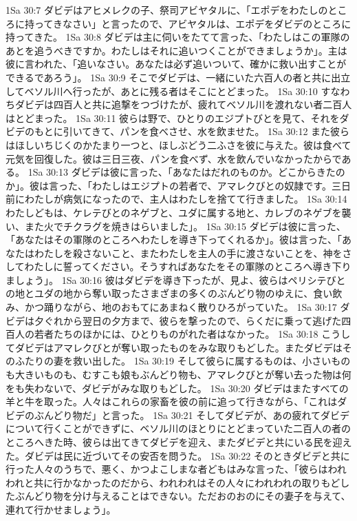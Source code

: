 1Sa 30:7  ダビデはアヒメレクの子、祭司アビヤタルに、「エポデをわたしのところに持ってきなさい」と言ったので、アビヤタルは、エポデをダビデのところに持ってきた。
1Sa 30:8  ダビデは主に伺いをたてて言った、「わたしはこの軍隊のあとを追うべきですか。わたしはそれに追いつくことができましょうか」。主は彼に言われた、「追いなさい。あなたは必ず追いついて、確かに救い出すことができるであろう」。
1Sa 30:9  そこでダビデは、一緒にいた六百人の者と共に出立してベソル川へ行ったが、あとに残る者はそこにとどまった。
1Sa 30:10  すなわちダビデは四百人と共に追撃をつづけたが、疲れてベソル川を渡れない者二百人はとどまった。
1Sa 30:11  彼らは野で、ひとりのエジプトびとを見て、それをダビデのもとに引いてきて、パンを食べさせ、水を飲ませた。
1Sa 30:12  また彼らはほしいちじくのかたまり一つと、ほしぶどう二ふさを彼に与えた。彼は食べて元気を回復した。彼は三日三夜、パンを食べず、水を飲んでいなかったからである。
1Sa 30:13  ダビデは彼に言った、「あなたはだれのものか。どこからきたのか」。彼は言った、「わたしはエジプトの若者で、アマレクびとの奴隷です。三日前にわたしが病気になったので、主人はわたしを捨てて行きました。
1Sa 30:14  わたしどもは、ケレテびとのネゲブと、ユダに属する地と、カレブのネゲブを襲い、また火でチクラグを焼きはらいました」。
1Sa 30:15  ダビデは彼に言った、「あなたはその軍隊のところへわたしを導き下ってくれるか」。彼は言った、「あなたはわたしを殺さないこと、またわたしを主人の手に渡さないことを、神をさしてわたしに誓ってください。そうすればあなたをその軍隊のところへ導き下りましょう」。
1Sa 30:16  彼はダビデを導き下ったが、見よ、彼らはペリシテびとの地とユダの地から奪い取ったさまざまの多くのぶんどり物のゆえに、食い飲み、かつ踊りながら、地のおもてにあまねく散りひろがっていた。
1Sa 30:17  ダビデは夕ぐれから翌日の夕方まで、彼らを撃ったので、らくだに乗って逃げた四百人の若者たちのほかには、ひとりものがれた者はなかった。
1Sa 30:18  こうしてダビデはアマレクびとが奪い取ったものをみな取りもどした。またダビデはそのふたりの妻を救い出した。
1Sa 30:19  そして彼らに属するものは、小さいものも大きいものも、むすこも娘もぶんどり物も、アマレクびとが奪い去った物は何をも失わないで、ダビデがみな取りもどした。
1Sa 30:20  ダビデはまたすべての羊と牛を取った。人々はこれらの家畜を彼の前に追って行きながら、「これはダビデのぶんどり物だ」と言った。
1Sa 30:21  そしてダビデが、あの疲れてダビデについて行くことができずに、ベソル川のほとりにとどまっていた二百人の者のところへきた時、彼らは出てきてダビデを迎え、またダビデと共にいる民を迎えた。ダビデは民に近づいてその安否を問うた。
1Sa 30:22  そのときダビデと共に行った人々のうちで、悪く、かつよこしまな者どもはみな言った、「彼らはわれわれと共に行かなかったのだから、われわれはその人々にわれわれの取りもどしたぶんどり物を分け与えることはできない。ただおのおのにその妻子を与えて、連れて行かせましょう」。
